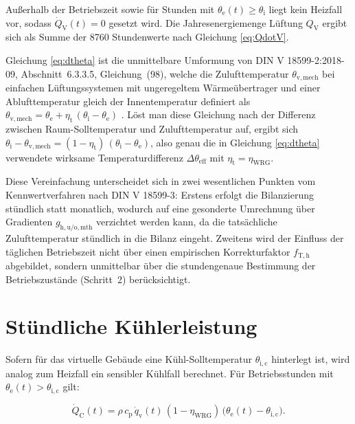 \documentclass{scrreprt}
\begin{document}
Außerhalb der Betriebszeit sowie für Stunden mit
$\theta_{\mathrm{e}}(t) \geq \theta_{\mathrm{i}}$ liegt kein Heizfall
vor, sodass $\dot Q_{\mathrm{V}}(t) = 0$ gesetzt wird. Die
Jahresenergiemenge Lüftung $Q_{\mathrm{V}}$ ergibt sich als Summe der
8760 Stundenwerte nach Gleichung \eqref{eq:QdotV}.

Gleichung \eqref{eq:dtheta} ist die unmittelbare Umformung von
DIN V 18599-2:2018-09, Abschnitt~6.3.3.5, Gleichung~(98), welche die
Zulufttemperatur $\theta_{\mathrm{v,mech}}$ bei einfachen
Lüftungssystemen mit ungeregeltem Wärmeübertrager und einer
Ablufttemperatur gleich der Innentemperatur definiert als
$\theta_{\mathrm{v,mech}} = \theta_{\mathrm{e}} + \eta_{\mathrm{t}} \,
(\theta_{\mathrm{i}} - \theta_{\mathrm{e}})$
\parencite{DIN185992}. Löst man diese Gleichung nach der Differenz
zwischen Raum-Solltemperatur und Zulufttemperatur auf, ergibt sich
$\theta_{\mathrm{i}} - \theta_{\mathrm{v,mech}} = (1 -
\eta_{\mathrm{t}}) \, (\theta_{\mathrm{i}} - \theta_{\mathrm{e}})$,
also genau die in Gleichung \eqref{eq:dtheta} verwendete wirksame
Temperaturdifferenz $\Delta\theta_{\mathrm{eff}}$ mit
$\eta_{\mathrm{t}} = \eta_{\mathrm{WRG}}$.

Diese Vereinfachung unterscheidet sich in zwei wesentlichen Punkten
vom Kennwertverfahren nach DIN V 18599-3: Erstens erfolgt die
Bilanzierung stündlich statt monatlich, wodurch auf eine gesonderte
Umrechnung über Gradienten $g_{\mathrm{h,u/o,mth}}$
\parencite{DIN185993} verzichtet werden kann, da die tatsächliche
Zulufttemperatur stündlich in die Bilanz eingeht. Zweitens wird der
Einfluss der täglichen Betriebszeit nicht über einen empirischen
Korrekturfaktor $f_{\mathrm{T,h}}$ \parencite{DIN185993} abgebildet,
sondern unmittelbar über die stundengenaue Bestimmung der
Betriebszustände (Schritt~2) berücksichtigt.

\section{Stündliche Kühlerleistung}
Sofern für das virtuelle Gebäude eine Kühl-Solltemperatur
$\theta_{\mathrm{i,c}}$ hinterlegt ist, wird analog zum Heizfall ein
sensibler Kühlfall berechnet. Für Betriebsstunden mit
$\theta_{\mathrm{e}}(t) > \theta_{\mathrm{i,c}}$ gilt:

\begin{equation}\label{eq:QdotC}
    \dot Q_{\mathrm{C}}(t) = \rho \, c_{\mathrm{p}} \, \dot q_{\mathrm{v}}(t) \, (1-\eta_{\mathrm{WRG}}) \, \bigl(\theta_{\mathrm{e}}(t) - \theta_{\mathrm{i,c}}\bigr).
\end{equation}
\end{document}
